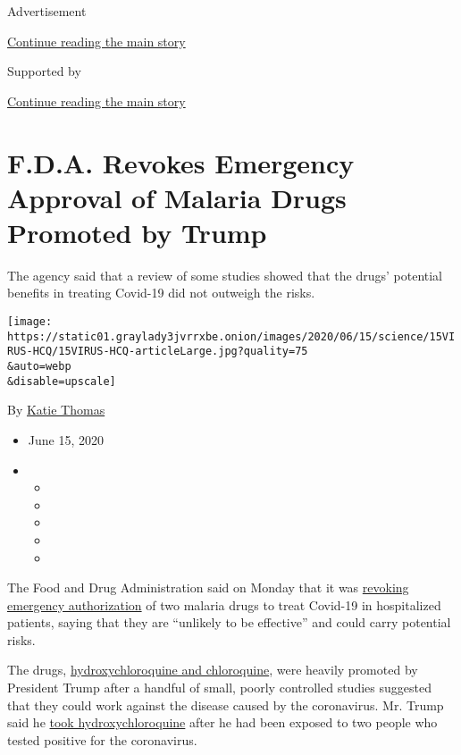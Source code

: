 Advertisement

\protect\hyperlink{after-top}{Continue reading the main story}

Supported by

\protect\hyperlink{after-sponsor}{Continue reading the main story}

\hypertarget{fda-revokes-emergency-approval-of-malaria-drugs-promoted-by-trump}{%
\section{F.D.A. Revokes Emergency Approval of Malaria Drugs Promoted by
Trump}\label{fda-revokes-emergency-approval-of-malaria-drugs-promoted-by-trump}}

The agency said that a review of some studies showed that the drugs'
potential benefits in treating Covid-19 did not outweigh the risks.

\texttt{[image: https://static01.graylady3jvrrxbe.onion/images/2020/06/15/science/15VIRUS-HCQ/15VIRUS-HCQ-articleLarge.jpg?quality=75\\\&auto=webp\\\&disable=upscale]}

By \href{https://www.nytimes3xbfgragh.onion/by/katie-thomas}{Katie
Thomas}

\begin{itemize}
\item
  June 15, 2020
\item
  \begin{itemize}
  \item
  \item
  \item
  \item
  \item
  \end{itemize}
\end{itemize}

The Food and Drug Administration said on Monday that it was
\href{https://www.fda.gov/media/138945/download}{revoking emergency
authorization} of two malaria drugs to treat Covid-19 in hospitalized
patients, saying that they are ``unlikely to be effective'' and could
carry potential risks.

The drugs,
\href{https://www.nytimes3xbfgragh.onion/2020/06/20/health/hydroxychloroquine-coronavirus-trial.html}{hydroxychloroquine
and chloroquine}, were heavily promoted by President Trump after a
handful of small, poorly controlled studies suggested that they could
work against the disease caused by the coronavirus. Mr. Trump said he
\href{https://www.nytimes3xbfgragh.onion/2020/06/03/us/politics/trump-physical-hydroxychloroquine.html}{took
hydroxychloroquine} after he had been exposed to two people who tested
positive for the coronavirus.

